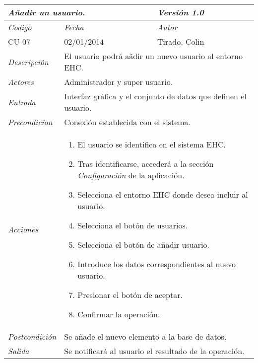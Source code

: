 \begin{center}
    \begin{tabular}{|p{3cm}|p{4cm}|p{4cm}|p{4cm}|}
    \hline \multicolumn{3}{|p{9cm}|}{\textit{A\~nadir un usuario.}} & \textit{Versi\'on 1.0} \\
	\hline \textit{Codigo} & \textit{Fecha} & \multicolumn{2}{|p{6cm}|}{\textit{Autor}} \\
	CU-07 & 02/01/2014 & \multicolumn{2}{|p{6cm}|}{Tirado, Colin} \\		
    \hline \textit{Descripci\'on} & \multicolumn{3}{|p{9cm}|}{El usuario podr\'a a\~adir un nuevo usuario al entorno EHC.} \\
    \hline \textit{Actores} & \multicolumn{3}{|p{9cm}|}{Administrador y super usuario.} \\
    \hline \textit{Entrada} & \multicolumn{3}{|p{9cm}|}{Interfaz gr\'afica y el conjunto de datos que definen el usuario.} \\
    \hline \textit{Precondic\'ion} & \multicolumn{3}{|p{9cm}|}{Conexi\'on establecida con el sistema.} \\
    \hline \textit{Acciones} & \multicolumn{3}{|p{9cm}|}{
        \begin{enumerate}
        \item El usuario se identifica en el sistema EHC.
        \item Tras identificarse, acceder\'a a la secci\'on \textit{Configuraci\'on} de la aplicaci\'on.
        \item Selecciona el entorno EHC donde desea incluir al usuario.
        \item Selecciona el bot\'on de usuarios.
        \item Selecciona el bot\'on de a\~nadir usuario.
        \item Introduce los datos correspondientes al nuevo usuario.
        \item Presionar el bot\'on de aceptar.
        \item Confirmar la operaci\'on.       
        \end{enumerate}
           } \\
    \hline \textit{Postcondici\'on} & \multicolumn{3}{|p{9cm}|}{Se a\~nade el nuevo elemento a la base de datos.} \\
    \hline \textit{Salida} & \multicolumn{3}{|p{9cm}|}{Se notificar\'a al usuario el resultado de la operaci\'on.} \\ \hline
    \end{tabular}
\end{center}